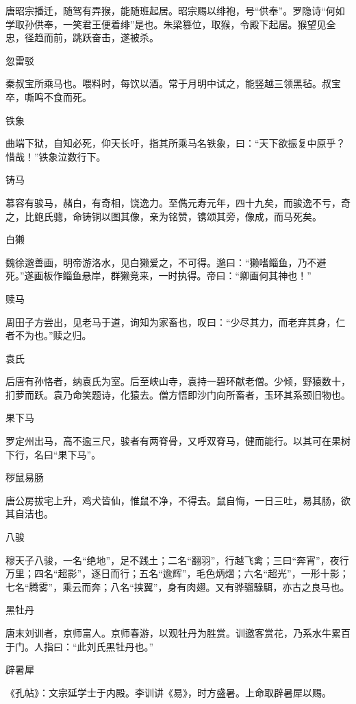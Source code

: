 \documentclass[a4paper,12pt,UTF8,twoside]{ctexbook}
\begin{document}
    唐昭宗播迁，随驾有弄猴，能随班起居。昭宗赐以绯袍，号“供奉”。罗隐诗“何如学取孙供奉，一笑君王便着绯”是也。朱梁篡位，取猴，令殿下起居。猴望见全忠，径趋而前，跳跃奋击，遂被杀。
    
    忽雷驳
    
    秦叔宝所乘马也。喂料时，每饮以酒。常于月明中试之，能竖越三领黑毡。叔宝卒，嘶鸣不食而死。
    
    铁象
    
    曲端下狱，自知必死，仰天长吁，指其所乘马名铁象，曰：“天下欲振复中原乎？惜哉！”铁象泣数行下。
    
    铸马
    
    慕容有骏马，赭白，有奇相，饶逸力。至儁元寿元年，四十九矣，而骏逸不亏，奇之，比鲍氏骢，命铸铜以图其像，亲为铭赞，镌颂其旁，像成，而马死矣。
    
    白獭
    
    魏徐邈善画，明帝游洛水，见白獭爱之，不可得。邈曰：“獭嗜鲻鱼，乃不避死。”遂画板作鲻鱼悬岸，群獭竞来，一时执得。帝曰：“卿画何其神也！”
    
    赎马
    
    周田子方尝出，见老马于道，询知为家畜也，叹曰：“少尽其力，而老弃其身，仁者不为也。”赎之归。
    
    袁氏
    
    后唐有孙恪者，纳袁氏为室。后至峡山寺，袁持一碧环献老僧。少倾，野猿数十，扪萝而跃。袁乃命笑题诗，化猿去。僧方悟即沙门向所畜者，玉环其系颈旧物也。
    
    果下马
    
    罗定州出马，高不逾三尺，骏者有两脊骨，又呼双脊马，健而能行。以其可在果树下行，名曰“果下马”。
    
    秽鼠易肠
    
    唐公房拔宅上升，鸡犬皆仙，惟鼠不净，不得去。鼠自悔，一日三吐，易其肠，欲其自洁也。
    
    八骏
    
    穆天子八骏，一名“绝地”，足不践土；二名“翻羽”，行越飞禽；三曰“奔宵”，夜行万里；四名“超影”，逐日而行；五名“逾辉”，毛色炳熠；六名“超光”，一形十影；七名“腾雾”，乘云而奔；八名“挟翼”，身有肉翅。又有骅骝騄駬，亦古之良马也。
    
    黑牡丹
    
    唐末刘训者，京师富人。京师春游，以观牡丹为胜赏。训邀客赏花，乃系水牛累百于门。人指曰：“此刘氏黑牡丹也。”
    
    辟暑犀
    
    《孔帖》：文宗延学士于内殿。李训讲《易》，时方盛暑。上命取辟暑犀以赐。
    
\end{document}
